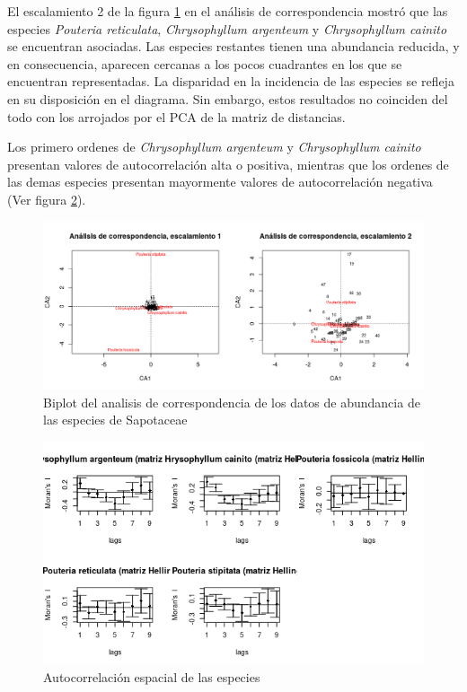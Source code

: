 \documentclass[11pt,]{article}
\begin{document}
El escalamiento 2 de la figura \ref{fig:Analisis_de_correspondencia} en
el análisis de correspondencia mostró que las especies \emph{Pouteria
reticulata}, \emph{Chrysophyllum argenteum} y \emph{Chrysophyllum
cainito} se encuentran asociadas. Las especies restantes tienen una
abundancia reducida, y en consecuencia, aparecen cercanas a los pocos
cuadrantes en los que se encuentran representadas. La disparidad en la
incidencia de las especies se refleja en su disposición en el diagrama.
Sin embargo, estos resultados no coinciden del todo con los arrojados
por el PCA de la matriz de distancias.

Los primero ordenes de \emph{Chrysophyllum argenteum} y
\emph{Chrysophyllum cainito} presentan valores de autocorrelación alta o
positiva, mientras que los ordenes de las demas especies presentan
mayormente valores de autocorrelación negativa (Ver figura
\ref{fig:Abundancia_matriz}).

\begin{figure}
\centering
\includegraphics[width=1.00000\textwidth]{analisis_de_correspondencia_actualizado.png}
\caption{Biplot del analisis de correspondencia de los datos de
abundancia de las especies de Sapotaceae
\label{fig:Analisis_de_correspondencia}}
\end{figure}

\begin{figure}
\centering
\includegraphics[width=1.00000\textwidth]{Abundancia_matriz.png}
\caption{Autocorrelación espacial de las especies
\label{fig:Abundancia_matriz}}
\end{figure}
\end{document}
